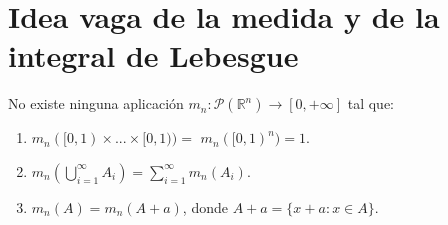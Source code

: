 \newpage
\section{Idea vaga de la medida y de la integral de Lebesgue}

\begin{teo}
\label{teo:asd}
No existe ninguna aplicación $ m_n: \mathcal{P}(\mathbb{R}^n) \longrightarrow [0, +\infty]$ tal que:
\begin{enumerate}
    \item[(i)] $m_n([0,1) \times ... \times [0,1)) = $ $m_n([0,1)^n) = 1$.
    \item[(ii)] $m_n\left(\displaystyle\bigcup_{i=1}^{\infty}{A_i }\right) = \displaystyle\sum_{i=1}^\infty m_n(A_i)$.
    \item[(iii)] $m_n(A) = m_n(A+a)$, donde $A + a = \{x+a : x \in A\}$.
\end{enumerate}
\end{teo}

